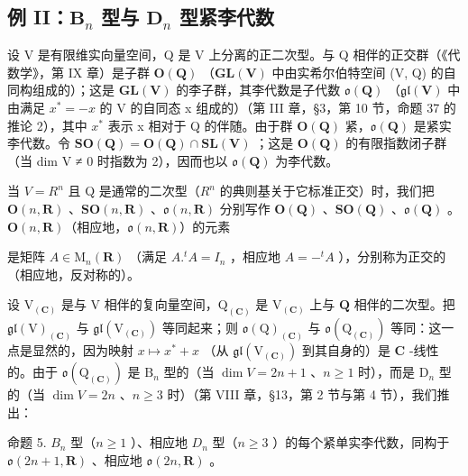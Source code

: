 \subsection{\texorpdfstring{例 II：\(\mathbf{B}_n\) 型与 \(\mathbf{D}_n\) 型紧李代数}{例 II：\textbackslash mathbf\{B\}\_n 型与 \textbackslash mathbf\{D\}\_n 型紧李代数}}

设 V 是有限维实向量空间，Q 是 V 上分离的正二次型。与 Q 相伴的正交群（《代数学》，第 IX 章）是子群 \(\mathbf{O}(\mathbf{Q})\) （\(\mathbf{GL}(\mathbf{V})\) 中由实希尔伯特空间 (V, Q) 的自同构组成的）；这是 \(\mathbf{GL}(\mathbf{V})\) 的李子群，其李代数是子代数 \(\mathfrak{o}(\mathbf{Q})\) （\(\mathfrak{gl}(\mathbf{V})\) 中由满足 \(x^{*} = -x\) 的 V 的自同态 x 组成的）（第 III 章，§3，第 10 节，命题 37 的推论 2），其中 \(x^{*}\) 表示 x 相对于 Q 的伴随。由于群 \(\mathbf{O}(\mathbf{Q})\) 紧，\(\mathfrak{o}(\mathbf{Q})\) 是紧实李代数。令 \(\mathbf{SO}(\mathbf{Q}) = \mathbf{O}(\mathbf{Q}) \cap \mathbf{SL}(\mathbf{V})\) ；这是 \(\mathbf{O}(\mathbf{Q})\) 的有限指数闭子群（当 dim V ≠ 0 时指数为 2），因而也以 \(\mathfrak{o}(\mathbf{Q})\) 为李代数。

当 \(V = R^{n}\) 且 Q 是通常的二次型（\(R^{n}\) 的典则基关于它标准正交）时，我们把 \(\mathbf{O}(n, \mathbf{R})\) 、\(\mathbf{SO}(n, \mathbf{R})\) 、\(\mathfrak{o}(n, \mathbf{R})\) 分别写作 \(\mathbf{O}(\mathbf{Q})\) 、\(\mathbf{SO}(\mathbf{Q})\) 、\(\mathfrak{o}(\mathbf{Q})\) 。\(\mathbf{O}(n, \mathbf{R})\)（相应地，\(\mathfrak{o}(n, \mathbf{R})\)）的元素

是矩阵 \(A \in \mathrm{M}_n(\mathbf{R})\) （满足 \(A.^t A = I_n\) ，相应地 \(A = -^t A\) ），分别称为正交的（相应地，反对称的）。

设 \(\mathrm{V}_{(\mathbf{C})}\) 是与 \(\mathrm{V}\) 相伴的复向量空间，\(\mathrm{Q}_{(\mathbf{C})}\) 是 \(\mathrm{V}_{(\mathbf{C})}\) 上与 \(\mathbf{Q}\) 相伴的二次型。把 \(\mathfrak{gl}(\mathrm{V})_{(\mathbf{C})}\) 与 \(\mathfrak{gl}(\mathrm{V}_{(\mathbf{C})})\) 等同起来；则 \(\mathfrak{o}(\mathrm{Q})_{(\mathbf{C})}\) 与 \(\mathfrak{o}(\mathrm{Q}_{(\mathbf{C})})\) 等同：这一点是显然的，因为映射 \(x \mapsto x^{*} + x\) （从 \(\mathfrak{gl}(\mathrm{V}_{(\mathbf{C})})\) 到其自身的）是 \(\mathbf{C}\) -线性的。由于 \(\mathfrak{o}(\mathrm{Q}_{(\mathbf{C})})\) 是 \(\mathrm{B}_n\) 型的（当 \(\dim V = 2n + 1\) 、\(n \geq 1\) 时），而是 \(\mathrm{D}_n\) 型的（当 \(\dim V = 2n\) 、\(n \geq 3\) 时）（第 VIII 章，§13，第 2 节与第 4 节），我们推出：

命题 5. \(B_{n}\) 型（\(n \geq 1\) ）、相应地 \(D_{n}\) 型（\(n \geq 3\) ）的每个紧单实李代数，同构于 \(\mathfrak{o}(2n + 1, \mathbf{R})\) 、相应地 \(\mathfrak{o}(2n, \mathbf{R})\) 。

